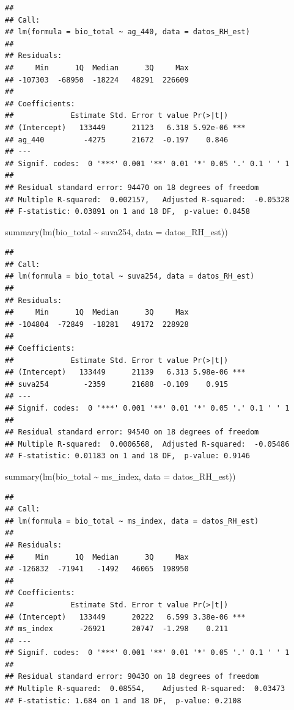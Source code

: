 \documentclass[
]{book}
\newenvironment{Shaded}{\begin{snugshade}}{\end{snugshade}}
\newcommand{\AttributeTok}[1]{\textcolor[rgb]{0.77,0.63,0.00}{#1}}
\newcommand{\FunctionTok}[1]{\textcolor[rgb]{0.00,0.00,0.00}{#1}}
\newcommand{\NormalTok}[1]{#1}
\newcommand{\SpecialCharTok}[1]{\textcolor[rgb]{0.00,0.00,0.00}{#1}}
\begin{document}
\begin{verbatim}
## 
## Call:
## lm(formula = bio_total ~ ag_440, data = datos_RH_est)
## 
## Residuals:
##     Min      1Q  Median      3Q     Max 
## -107303  -68950  -18224   48291  226609 
## 
## Coefficients:
##             Estimate Std. Error t value Pr(>|t|)    
## (Intercept)   133449      21123   6.318 5.92e-06 ***
## ag_440         -4275      21672  -0.197    0.846    
## ---
## Signif. codes:  0 '***' 0.001 '**' 0.01 '*' 0.05 '.' 0.1 ' ' 1
## 
## Residual standard error: 94470 on 18 degrees of freedom
## Multiple R-squared:  0.002157,   Adjusted R-squared:  -0.05328 
## F-statistic: 0.03891 on 1 and 18 DF,  p-value: 0.8458
\end{verbatim}

\begin{Shaded}
\begin{Highlighting}[]
\FunctionTok{summary}\NormalTok{(}\FunctionTok{lm}\NormalTok{(bio\_total }\SpecialCharTok{\textasciitilde{}}\NormalTok{ suva254, }\AttributeTok{data =}\NormalTok{ datos\_RH\_est))}
\end{Highlighting}
\end{Shaded}

\begin{verbatim}
## 
## Call:
## lm(formula = bio_total ~ suva254, data = datos_RH_est)
## 
## Residuals:
##     Min      1Q  Median      3Q     Max 
## -104804  -72849  -18281   49172  228928 
## 
## Coefficients:
##             Estimate Std. Error t value Pr(>|t|)    
## (Intercept)   133449      21139   6.313 5.98e-06 ***
## suva254        -2359      21688  -0.109    0.915    
## ---
## Signif. codes:  0 '***' 0.001 '**' 0.01 '*' 0.05 '.' 0.1 ' ' 1
## 
## Residual standard error: 94540 on 18 degrees of freedom
## Multiple R-squared:  0.0006568,  Adjusted R-squared:  -0.05486 
## F-statistic: 0.01183 on 1 and 18 DF,  p-value: 0.9146
\end{verbatim}

\begin{Shaded}
\begin{Highlighting}[]
\FunctionTok{summary}\NormalTok{(}\FunctionTok{lm}\NormalTok{(bio\_total }\SpecialCharTok{\textasciitilde{}}\NormalTok{ ms\_index, }\AttributeTok{data =}\NormalTok{ datos\_RH\_est))}
\end{Highlighting}
\end{Shaded}

\begin{verbatim}
## 
## Call:
## lm(formula = bio_total ~ ms_index, data = datos_RH_est)
## 
## Residuals:
##     Min      1Q  Median      3Q     Max 
## -126832  -71941   -1492   46065  198950 
## 
## Coefficients:
##             Estimate Std. Error t value Pr(>|t|)    
## (Intercept)   133449      20222   6.599 3.38e-06 ***
## ms_index      -26921      20747  -1.298    0.211    
## ---
## Signif. codes:  0 '***' 0.001 '**' 0.01 '*' 0.05 '.' 0.1 ' ' 1
## 
## Residual standard error: 90430 on 18 degrees of freedom
## Multiple R-squared:  0.08554,    Adjusted R-squared:  0.03473 
## F-statistic: 1.684 on 1 and 18 DF,  p-value: 0.2108
\end{verbatim}
\end{document}
